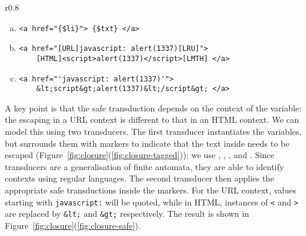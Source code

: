 \begin{wrapfigure}{r}{0.8\textwidth}
\begin{center}
\begin{minipage}{\linewidth}
\begin{enumerate}[(a)]
\item \label{fig:closure-eg}
\begin{verbatim}
<a href="{$li}"> {$txt} </a>
\end{verbatim}
\item \label{fig:closure-tagged}
\begin{verbatim}
<a href="[URL]javascript: alert(1337)[LRU]">
    [HTML]<script>alert(1337)</script>[LMTH] </a>
\end{verbatim}
\item \label{fig:closure-safe}
\begin{verbatim}
<a href="'javascript: alert(1337)'">
    &lt;script&gt;alert(1337)&lt;/script&gt; </a>
\end{verbatim}
\end{enumerate}
\end{minipage}
\end{center}
\vspace{-3ex}
\caption{\label{fig:closure}A simple template (\ref{fig:closure-eg}) with two transduction steps (\ref{fig:closure-tagged}, \ref{fig:closure-safe}).}
\vspace{-3ex}
\end{wrapfigure}


A key point is that the safe transduction depends on the context of the variable:
the escaping in a URL context is different to that in an HTML context.
We can model this using two transducers.
The first transducer instantiates the variables, but surrounds them with markers to indicate that the text inside needs to be escaped
(Figure~\ref{fig:closure}(\ref{fig:closure-tagged}));
we use \urlstarttag, \urlendtag, \htmlstarttag, and \htmlendtag.
Since transducers are a generalisation of finite automata, they are able to identify contexts using regular languages. The second transducer then applies the appropriate safe transductions inside the markers.
For the URL context, values starting with \texttt{javascript:} will be quoted, while in HTML, instances of \texttt{<} and \texttt{>} are replaced by \texttt{\&lt;} and \texttt{\&gt;} respectively.
The result is shown in Figure~\ref{fig:closure}(\ref{fig:closure-safe}).

